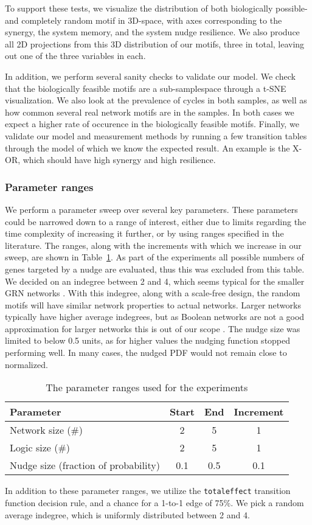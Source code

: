 \documentclass[../main.tex]{subfiles}
\begin{document}
To support these tests, we visualize the distribution of both biologically possible- and completely random motif in 3D-space, with axes corresponding to the synergy, the system memory, and the system nudge resilience.
We also produce all 2D projections from this 3D distribution of our motifs, three in total, leaving out one of the three variables in each.

In addition, we perform several sanity checks to validate our model.
We check that the biologically feasible motifs are a sub-samplespace through a t-SNE visualization.
We also look at the prevalence of cycles in both samples, as well as how common several real network motifs are in the samples.
In both cases we expect a higher rate of occurence in the biologically feasible motifs.
Finally, we validate our model and measurement methods by running a few transition tables through the model of which we know the expected result.
An example is the X-OR, which should have high synergy and high resilience.

\subsubsection{Parameter ranges}

We perform a parameter sweep over several key parameters.
These parameters could be narrowed down to a range of interest, either due to limits regarding the time complexity of increasing it further, or by using ranges specified in the literature.
The ranges, along with the increments with which we increase in our sweep, are shown in Table~\ref{parameters}.
As part of the experiments all possible numbers of genes targeted by a nudge are evaluated, thus this was excluded from this table.
We decided on an indegree between 2 and 4, which seems typical for the smaller GRN networks \cite{lahdesmaki2003learning}.
With this indegree, along with a scale-free design, the random motifs will have similar network properties to actual networks.
Larger networks typically have higher average indegrees, but as Boolean networks are not a good approximation for larger networks this is out of our scope \cite{lahdesmaki2003learning, karlebach2008modelling}.
The nudge size was limited to below 0.5 units, as for higher values the nudging function stopped performing well.
In many cases, the nudged PDF would not remain close to normalized.


\begin{table}
\begin{tabular}{| l | c | c | c |}
\hline
Parameter & Start & End & Increment \\
\hline
Network size (\#) & 2 & 5 & 1 \\
Logic size (\#) & 2 & 5 & 1 \\
Nudge size (fraction of probability) & 0.1 & 0.5 & 0.1 \\
\hline
\end{tabular}
\centering
\caption{The parameter ranges used for the experiments}
\label{parameters}
\end{table}

In addition to these parameter ranges, we utilize the \texttt{totaleffect} transition function decision rule, and a chance for a 1-to-1 edge of 75\%.
We pick a random average indegree, which is uniformly distributed between 2 and 4. %
\end{document}

